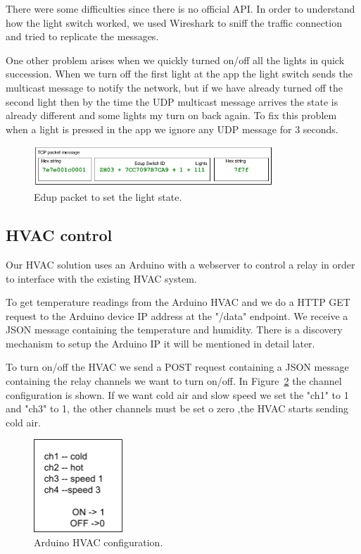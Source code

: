 There were some difficulties since there is no official API. In order to understand how the light switch worked, we used Wireshark to sniff the traffic connection and tried to replicate the messages.

One other problem arises when we quickly turned on/off all the lights in quick succession. When we turn off the first light at the app the light switch sends the multicast message to notify the network, but if we have already turned off the second light then by the time the \ac{UDP} multicast message arrives the state is already different and some lights my turn on back again. To fix this problem when a light is pressed in the app we ignore any \ac{UDP} message for 3 seconds.


\begin{figure}[h]
\centering
\includegraphics[width=0.8\textwidth]{Figures/Edup_imp}
\caption{Edup packet to set the light state.}
\label{edup_imp}
\end{figure}



\subsection{HVAC control}

Our HVAC solution uses an Arduino with a webserver to control a relay in order to interface with the existing HVAC system.

To get temperature readings from the Arduino \ac{HVAC} and we do a \ac{HTTP}  GET request to the Arduino device IP address at the "/data" endpoint. We receive a \ac{JSON} message containing the temperature and humidity. There is a discovery mechanism to setup the Arduino IP it will be mentioned in detail later.

To turn on/off the \ac{HVAC} we send a POST request containing a \ac{JSON} message containing the relay channels we want to turn on/off. In Figure~\ref{arduino_post_imp} the channel configuration is shown. If we want cold air   and slow speed we set the "ch1" to 1 and "ch3" to 1, the other channels must be set o zero ,the \ac{HVAC} starts sending cold air.


\begin{figure}[h]
\centering
\includegraphics[width=0.3\textwidth]{Figures/temperature_post_imp}
\caption{Arduino HVAC configuration.}
\label{arduino_post_imp}
\end{figure}




